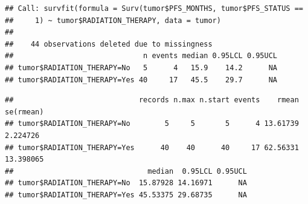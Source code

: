 \documentclass[
  11pt,
]{article}
\newenvironment{Shaded}{\begin{snugshade}}{\end{snugshade}}
\newcommand{\AttributeTok}[1]{\textcolor[rgb]{0.77,0.63,0.00}{#1}}
\newcommand{\DecValTok}[1]{\textcolor[rgb]{0.00,0.00,0.81}{#1}}
\newcommand{\FunctionTok}[1]{\textcolor[rgb]{0.00,0.00,0.00}{#1}}
\newcommand{\NormalTok}[1]{#1}
\newcommand{\OtherTok}[1]{\textcolor[rgb]{0.56,0.35,0.01}{#1}}
\newcommand{\SpecialCharTok}[1]{\textcolor[rgb]{0.00,0.00,0.00}{#1}}
\newcommand{\StringTok}[1]{\textcolor[rgb]{0.31,0.60,0.02}{#1}}
\begin{document}
\begin{Shaded}
\end{Shaded}

\begin{verbatim}
## Call: survfit(formula = Surv(tumor$PFS_MONTHS, tumor$PFS_STATUS == 
##     1) ~ tumor$RADIATION_THERAPY, data = tumor)
## 
##    44 observations deleted due to missingness 
##                              n events median 0.95LCL 0.95UCL
## tumor$RADIATION_THERAPY=No   5      4   15.9    14.2      NA
## tumor$RADIATION_THERAPY=Yes 40     17   45.5    29.7      NA
\end{verbatim}

\begin{Shaded}
\end{Shaded}

\begin{verbatim}
##                             records n.max n.start events    rmean se(rmean)
## tumor$RADIATION_THERAPY=No        5     5       5      4 13.61739  2.224726
## tumor$RADIATION_THERAPY=Yes      40    40      40     17 62.56331 13.398065
##                               median  0.95LCL 0.95UCL
## tumor$RADIATION_THERAPY=No  15.87928 14.16971      NA
## tumor$RADIATION_THERAPY=Yes 45.53375 29.68735      NA
\end{verbatim}
\end{document}
